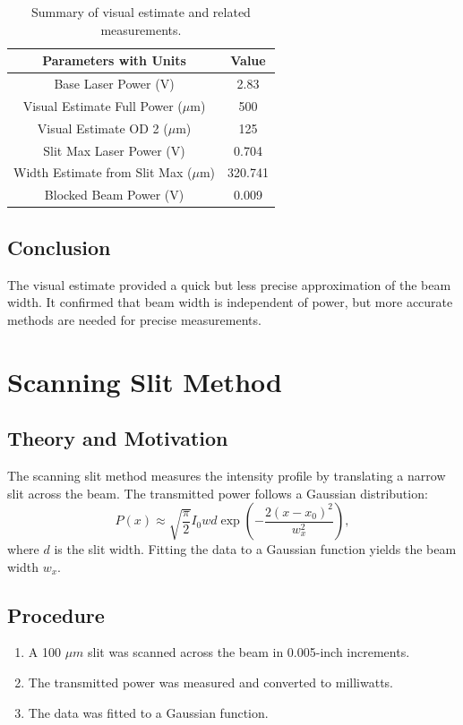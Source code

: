 \documentclass[12pt]{article}
\begin{document}
\begin{table}[h!]
    \centering
    \begin{tabular}{|c|c|}
        \hline
        \textbf{Parameters with Units} & \textbf{Value} \\
        \hline
        Base Laser Power (V) & 2.83 \\
        Visual Estimate Full Power ($\mu$m) & 500 \\
        Visual Estimate OD 2 ($\mu$m) & 125 \\
        Slit Max Laser Power (V) & 0.704 \\
        Width Estimate from Slit Max ($\mu$m) & 320.741 \\
        Blocked Beam Power (V) & 0.009 \\
        \hline
    \end{tabular}
    \caption{Summary of visual estimate and related measurements.}
    \label{tab:visual_estimate}
\end{table}

\subsection{Conclusion}
The visual estimate provided a quick but less precise approximation of the beam width. It confirmed that beam width is independent of power, but more accurate methods are needed for precise measurements.

\section{Scanning Slit Method}

\subsection{Theory and Motivation}
The scanning slit method measures the intensity profile by translating a narrow slit across the beam. The transmitted power follows a Gaussian distribution:
\[
P(x) \approx \sqrt{\frac{\pi}{2}} I_0 w d \exp\left(-\frac{2(x - x_0)^2}{w_x^2}\right),
\]
where \( d \) is the slit width. Fitting the data to a Gaussian function yields the beam width \( w_x \).

\subsection{Procedure}
\begin{enumerate}
    \item A 100 \(\mu m\) slit was scanned across the beam in 0.005-inch increments.
    \item The transmitted power was measured and converted to milliwatts.
    \item The data was fitted to a Gaussian function.
\end{enumerate}
\end{document}
